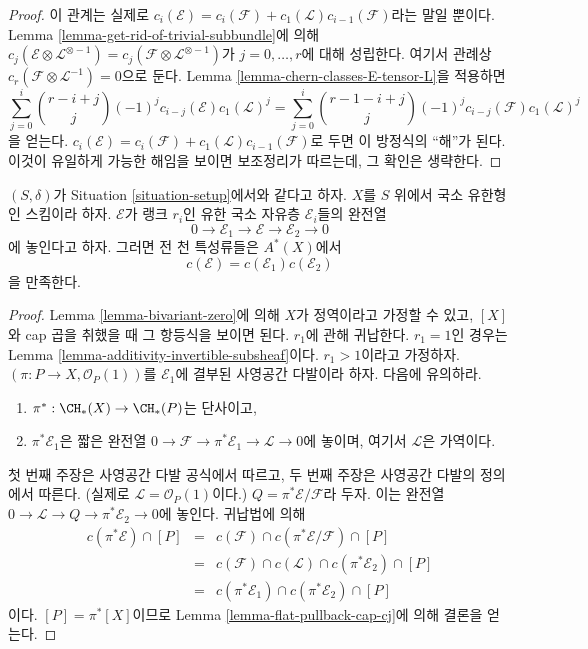 \begin{proof}
이 관계는 실제로
$c_i(\mathcal{E}) = c_i(\mathcal{F}) + c_1(\mathcal{L})c_{i - 1}(\mathcal{F})$라는
말일 뿐이다. Lemma \ref{lemma-get-rid-of-trivial-subbundle}에 의해
$c_j(\mathcal{E} \otimes \mathcal{L}^{\otimes -1})
= c_j(\mathcal{F} \otimes \mathcal{L}^{\otimes -1})$가
$j = 0, \ldots, r$에 대해 성립한다. 여기서 관례상
$c_r(\mathcal{F} \otimes \mathcal{L}^{-1}) = 0$으로 둔다.
Lemma \ref{lemma-chern-classes-E-tensor-L}을 적용하면
$$
\sum_{j = 0}^i
\binom{r - i + j}{j} (-1)^j c_{i - j}({\mathcal E}) c_1({\mathcal L})^j
=
\sum_{j = 0}^i
\binom{r - 1 - i + j}{j} (-1)^j c_{i - j}({\mathcal F}) c_1({\mathcal L})^j
$$
을 얻는다.
$c_i(\mathcal{E}) = c_i(\mathcal{F}) + c_1(\mathcal{L})c_{i - 1}(\mathcal{F})$로
두면 이 방정식의 “해”가 된다. 이것이 유일하게 가능한 해임을 보이면
보조정리가 따르는데, 그 확인은 생략한다.
\end{proof}

\begin{lemma}
\label{lemma-additivity-chern-classes}
$(S, \delta)$가 Situation \ref{situation-setup}에서와 같다고 하자.
$X$를 $S$ 위에서 국소 유한형인 스킴이라 하자. ${\mathcal E}$가
랭크 $r_i$인 유한 국소 자유층 $\mathcal{E}_i$들의 완전열
$$
0
\to
{\mathcal E}_1
\to
{\mathcal E}
\to
{\mathcal E}_2
\to
0
$$
에 놓인다고 하자. 그러면 전 천 특성류들은 $A^*(X)$에서
$$
c({\mathcal E}) = c({\mathcal E}_1) c({\mathcal E}_2)
$$
을 만족한다.
\end{lemma}

\begin{proof}
Lemma \ref{lemma-bivariant-zero}에 의해 $X$가 정역이라고 가정할 수
있고, $[X]$와 cap 곱을 취했을 때 그 항등식을 보이면 된다.
$r_1$에 관해 귀납한다. $r_1 = 1$인 경우는 Lemma
\ref{lemma-additivity-invertible-subsheaf}이다. $r_1 > 1$이라고
가정하자. $(\pi : P \to X, \mathcal{O}_P(1))$를
$\mathcal{E}_1$에 결부된 사영공간 다발이라 하자. 다음에 유의하라.
\begin{enumerate}
\item $\pi^* : \CH_*(X) \to \CH_*(P)$는 단사이고,
\item $\pi^*\mathcal{E}_1$은 짧은 완전열
$0 \to \mathcal{F} \to \pi^*\mathcal{E}_1 \to \mathcal{L} \to 0$에
놓이며, 여기서 $\mathcal{L}$은 가역이다.
\end{enumerate}
첫 번째 주장은 사영공간 다발 공식에서 따르고, 두 번째 주장은 사영공간
다발의 정의에서 따른다. (실제로
$\mathcal{L} = \mathcal{O}_P(1)$이다.)
$Q = \pi^*\mathcal{E}/\mathcal{F}$라 두자. 이는 완전열
$0 \to \mathcal{L} \to Q \to \pi^*\mathcal{E}_2 \to 0$에 놓인다.
귀납법에 의해
\begin{eqnarray*}
c(\pi^*\mathcal{E}) \cap [P]
& = &
c(\mathcal{F}) \cap c(\pi^*\mathcal{E}/\mathcal{F}) \cap [P] \\
& = &
c(\mathcal{F}) \cap c(\mathcal{L}) \cap c(\pi^*\mathcal{E}_2) \cap [P] \\
& = &
c(\pi^*\mathcal{E}_1) \cap c(\pi^*\mathcal{E}_2) \cap [P]
\end{eqnarray*}
이다. $[P] = \pi^*[X]$이므로 Lemma
\ref{lemma-flat-pullback-cap-cj}에 의해 결론을 얻는다.
\end{proof}

